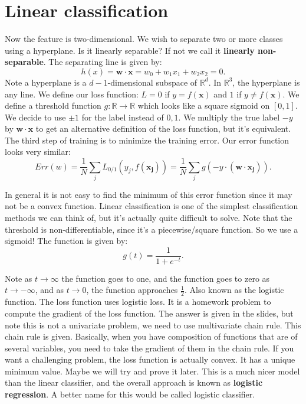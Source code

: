 \documentclass{amsbook}
\theoremstyle{plain}
\numberwithin{section}{chapter}
\numberwithin{equation}{chapter}
\theoremstyle{definition}
\theoremstyle{remark}
\newcommand{\R}{\mathbb{R}}
\newcommand{\vecc}{\mathbf}
\newcommand{\fracc}{\frac}
\begin{document}
\section{Linear classification}

Now the feature is two-dimensional. We wish to separate two or more classes using a hyperplane. Is it linearly separable? If not we call it \textbf{linearly non-separable}. The separating line is given by:
$$
h(x) = \vecc{w}\cdot \vecc{x} = w_0 + w_1x_1 + w_2x_2 = 0.
$$
Note a hyperplane is a $d - 1$-dimensional subspace of $\R^d$. In $\R^3$, the hyperplane is any line. We define our loss function: $L = 0$ if $y = f(\vecc{x})$ and $1$ if $y \neq f(\vecc{x})$. We define a threshold function $g:\R \to \R$ which looks like a square sigmoid on $[0,1]$. We decide to use $\pm 1$ for the label instead of $0,1$. We multiply the true label $-y$ by $\vecc{w} \cdot \vecc{x}$ to get an alternative definition of the loss function, but it's equivalent. The third step of training is to minimize the training error. Our error function looks very similar:
$$
Err(w) = \fracc{1}{N}\sum_j L_{0/1}(y_j,f(\vecc{x_j}))= \fracc{1}{N}\sum_j g(-y  \cdot (\vecc{w}\cdot \vecc{x_j})).
$$

In general it is not easy to find the minimum of this error function since it may not be a convex function. Linear classification is one of the simplest classification methods we can think of, but it's actually quite difficult to solve. Note that the threshold is non-differentiable, since it's a piecewise/square function. So we use a sigmoid! The function is given by:
$$
g(t) = \fracc{1}{1 + e^{-t}}.
$$

Note as $t \to \infty$ the function goes to one, and the function goes to zero as $t \to -\infty$, and as $t \to 0$, the function approaches $\fracc{1}{2}$. Also known as the logistic function. The loss function uses logistic loss. It is a homework problem to compute the gradient of the loss function. The answer is given in the slides, but note this is not a univariate problem, we need to use multivariate chain rule. This chain rule is given. Basically, when you have composition of functions that are of several variables, you need to take the gradient of them in the chain rule. If you want a challenging problem, the loss function is actually convex. It has a unique minimum value. Maybe we will try and prove it later. This is a much nicer model than the linear classifier, and the overall approach is known as \textbf{logistic regression}. A better name for this would be called logistic classifier. 
\end{document}
